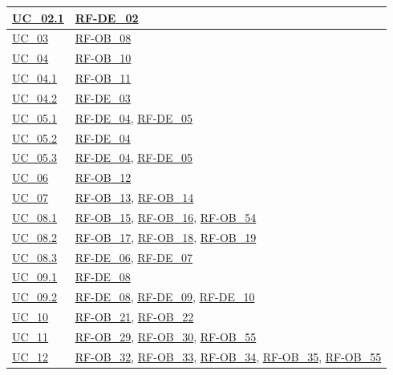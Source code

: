 \begin{longtable}{|>{\raggedright}p{}|>{\raggedright\arraybackslash}p{}|}
    \hline
    \hyperref[uc_02.1]{UC\_02.1} & \hyperlink{rf-de_2}{RF-DE\_02} \\
    \hline
    \hyperref[uc_03]{UC\_03} & \hyperlink{rf-ob_8}{RF-OB\_08} \\
    \hline
    \hyperref[uc_04]{UC\_04} & \hyperlink{rf-ob_10}{RF-OB\_10} \\
    \hline
    \hyperref[uc_04.1]{UC\_04.1} & \hyperlink{rf-ob_11}{RF-OB\_11} \\
    \hline
    \hyperref[uc_04.2]{UC\_04.2} & \hyperlink{rf-de_3}{RF-DE\_03} \\
    \hline
    \hyperref[uc_05.1]{UC\_05.1} & \hyperlink{rf-de_4}{RF-DE\_04}, \hyperlink{rf-de_5}{RF-DE\_05} \\
    \hline
    \hyperref[uc_05.2]{UC\_05.2} & \hyperlink{rf-de_4}{RF-DE\_04} \\
    \hline
    \hyperref[uc_05.3]{UC\_05.3} & \hyperlink{rf-de_4}{RF-DE\_04}, \hyperlink{rf-de_5}{RF-DE\_05} \\
    \hline
    \hyperref[uc_06]{UC\_06} & \hyperlink{rf-ob_12}{RF-OB\_12} \\
    \hline
    \hyperref[uc_07]{UC\_07} & \hyperlink{rf-ob_13}{RF-OB\_13}, \hyperlink{rf-ob_14}{RF-OB\_14} \\
    \hline
    \hyperref[uc_08.1]{UC\_08.1} & \hyperlink{rf-ob_15}{RF-OB\_15}, \hyperlink{rf-ob_16}{RF-OB\_16}, \hyperlink{rf-ob_54}{RF-OB\_54} \\
    \hline
    \hyperref[uc_08.2]{UC\_08.2} & \hyperlink{rf-ob_17}{RF-OB\_17}, \hyperlink{rf-ob_18}{RF-OB\_18}, \hyperlink{rf-ob_19}{RF-OB\_19} \\
    \hline
    \hyperref[uc_08.3]{UC\_08.3} & \hyperlink{rf-de_6}{RF-DE\_06}, \hyperlink{rf-de_7}{RF-DE\_07} \\
    \hline
    \hyperref[uc_09.1]{UC\_09.1} & \hyperlink{rf-de_8}{RF-DE\_08} \\
    \hline
    \hyperref[uc_09.2]{UC\_09.2} & \hyperlink{rf-de_8}{RF-DE\_08}, \hyperlink{rf-de_9}{RF-DE\_09}, \hyperlink{rf-de_10}{RF-DE\_10} \\
    \hline
    \hyperref[uc_10]{UC\_10} & \hyperlink{rf-ob_21}{RF-OB\_21}, \hyperlink{rf-ob_22}{RF-OB\_22} \\
    \hline
    \hyperref[uc_11]{UC\_11} & \hyperlink{rf-ob_29}{RF-OB\_29}, \hyperlink{rf-ob_30}{RF-OB\_30}, \hyperlink{rf-ob_55}{RF-OB\_55} \\
    \hline
    \hyperref[uc_12]{UC\_12} & \hyperlink{rf-ob_32}{RF-OB\_32}, \hyperlink{rf-ob_33}{RF-OB\_33}, \hyperlink{rf-ob_34}{RF-OB\_34}, \hyperlink{rf-ob_35}{RF-OB\_35}, \hyperlink{rf-ob_55}{RF-OB\_55} \\

\end{longtable}
